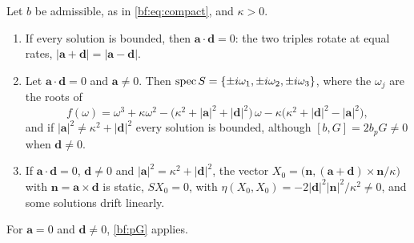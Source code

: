 \begin{theorem}
\label{bf:screen}
Let $b$ be admissible, as in \eqref{bf:eq:compact}, and $\kappa>0$.
\begin{enumerate}[label=(\roman*),leftmargin=2.2em]
\item If every solution is bounded, then $\mathbf a\cdot\mathbf d=0$: the two triples rotate at equal rates, $|\mathbf a+\mathbf d|=|\mathbf a-\mathbf d|$.
\item Let $\mathbf a\cdot\mathbf d=0$ and $\mathbf a\neq0$. Then $\operatorname{spec} S=\{\pm i\omega_1,\pm i\omega_2,\pm i\omega_3\}$, where the $\omega_j$ are the
roots of
\[
f(\omega)=\omega^3+\kappa\omega^2-\bigl(\kappa^2+|\mathbf a|^2+|\mathbf d|^2\bigr)\,\omega-\kappa\bigl(\kappa^2+|\mathbf d|^2-|\mathbf a|^2\bigr),
\]
and if $|\mathbf a|^2\neq\kappa^2+|\mathbf d|^2$ every solution is bounded, although $[b,G]=2b_pG\neq0$ when $\mathbf d\neq0$.
\item If $\mathbf a\cdot\mathbf d=0$, $\mathbf d\neq0$ and $|\mathbf a|^2=\kappa^2+|\mathbf d|^2$, the vector
$X_0=\bigl(\mathbf n,(\mathbf a+\mathbf d)\times\mathbf n/\kappa\bigr)$ with $\mathbf n=\mathbf a\times\mathbf d$ is static, $SX_0=0$, with
$\eta(X_0,X_0)=-2|\mathbf d|^2|\mathbf n|^2/\kappa^2\neq0$, and some solutions drift linearly.
\end{enumerate}
For $\mathbf a=0$ and $\mathbf d\neq0$, \cref{bf:pG} applies.
\end{theorem}

